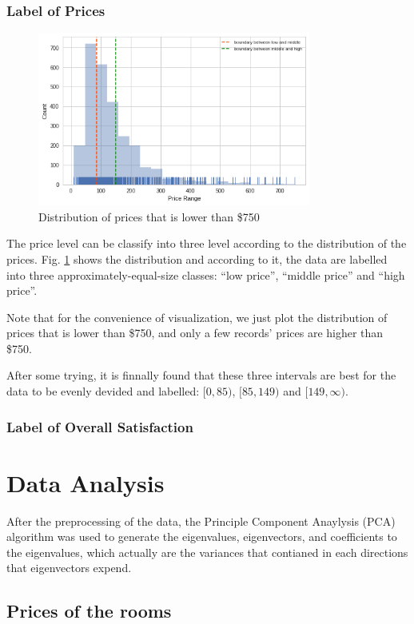 \documentclass[12pt]{article}
\begin{document}
\subsubsection{Label of Prices}
\begin{figure}[htb]
\centering
\includegraphics[width = 0.8\textwidth]{images/price-distr.png}
\caption{Distribution of prices that is lower than \$750}
\label{fig:price-distr}
\end{figure}
The price level can be classify into three level according to the distribution of the prices. Fig. \ref{fig:price-distr} shows the distribution and according to it, the data are labelled into three approximately-equal-size classes: ``low price'', ``middle price'' and ``high price''.\par
 Note that for the convenience of visualization, we just plot the distribution of prices that is lower than \$750, and only a few records' prices are higher than \$750.
 \par
 After some trying, it is finnally found that these three intervals are best for the data to be evenly devided and labelled: \([0,85)\), \([85, 149)\) and \([149, \infty)\).
\subsubsection{Label of Overall Satisfaction}
\section{Data Analysis}
After the preprocessing of the data, the Principle Component Anaylysis (PCA) algorithm was used to generate the eigenvalues, eigenvectors, and coefficients to the eigenvalues, which actually are the variances that contianed in each directions that eigenvectors expend.
\subsection{Prices of the rooms}
\end{document}
